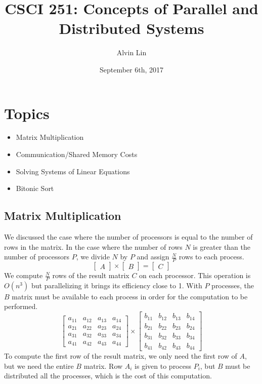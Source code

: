 \documentclass[letterpaper, 12pt]{math}
\title{CSCI 251: Concepts of Parallel and Distributed Systems}
\author{Alvin Lin}
\date{September 6th, 2017}
\begin{document}
\maketitle

\section*{Topics}
\begin{itemize}
  \item Matrix Multiplication
  \item Communication/Shared Memory Costs
  \item Solving Systems of Linear Equations
  \item Bitonic Sort
\end{itemize}

\subsection*{Matrix Multiplication}
We discussed the case where the number of processors is equal to the number of
rows in the matrix. In the case where the number of rows \( N \) is greater
than the number of processors \( P \), we divide \( N \) by \( P \) and assign
\( \frac{N}{P} \) rows to each process.
\[ \begin{bmatrix}A\end{bmatrix}\times\begin{bmatrix}B\end{bmatrix} =
  \begin{bmatrix}C\end{bmatrix} \]
We compute \( \frac{N}{P} \) rows of the result matrix \( C \) on each
processor. This operation is \( O(n^3) \) but parallelizing it brings its
efficiency close to 1. With \( P \) processes, the \( B \) matrix must be
available to each process in order for the computation to be performed.
\[ \begin{bmatrix}
  a_{11} & a_{12} & a_{13} & a_{14} \\
  a_{21} & a_{22} & a_{23} & a_{24} \\
  a_{31} & a_{32} & a_{33} & a_{34} \\
  a_{41} & a_{42} & a_{43} & a_{44}
\end{bmatrix}\times\begin{bmatrix}
  b_{11} & b_{12} & b_{13} & b_{14} \\
  b_{21} & b_{22} & b_{23} & b_{24} \\
  b_{31} & b_{32} & b_{33} & b_{34} \\
  b_{41} & b_{42} & b_{43} & b_{44}
\end{bmatrix} \]
To compute the first row of the result matrix, we only need the first row of
\( A \), but we need the entire \( B \) matrix. Row \( A_i \) is given to
process \( P_i \), but \( B \) must be distributed all the processes, which is
the cost of this computation.
\end{document}
